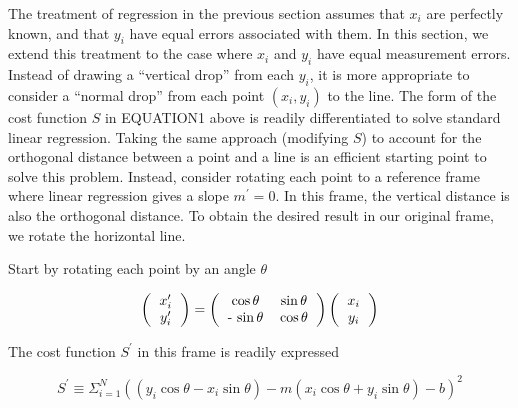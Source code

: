 \documentclass{article}
\begin{document}
The treatment of regression in the previous section assumes that $x_{i}$ are perfectly known, 
and that $y_{i}$ have equal errors associated with them.
In this section, we extend this treatment to the case where $x_{i}$ and $y_{i}$ have equal measurement errors.
Instead of drawing a ``vertical drop'' from each $y_{i}$,
it is more appropriate to consider a ``normal drop'' from each point $ \left( x_{i}, y_{i} \right) $ to the line.
The form of the cost function $S$ in EQUATION1 above is readily differentiated to solve standard linear regression.
Taking the same approach (modifying $S$) to account for the orthogonal distance between a point and a line
 is an efficient starting point to solve this problem.
Instead, consider rotating each point to a reference frame where linear regression gives a slope $ m^{\prime} = 0 $.
In this frame, the vertical distance is also the orthogonal distance.
To obtain the desired result in our original frame, we rotate the horizontal line.

Start by rotating each point by an angle $ \theta $


\begin{equation}
\left(
\begin{tabular}{c}
$x_{i}^{\prime}$ \\
$y_{i}^{\prime}$
\end{tabular}
\right) = 
\left(
\begin{tabular}{cc}
$ \cos \theta$ & $\sin \theta$ \\
 - $\sin \theta$ & $\cos \theta$ \\
\end{tabular}
\right)
\left(
\begin{tabular}{c}
$x_{i}$ \\
$y_{i}$
\end{tabular}
\right)
\end{equation}

The cost function $S^{\prime}$ in this frame is readily expressed

\begin{equation}
S^{\prime} \equiv \Sigma_{i=1}^{N} \left( \left( y_{i} \cos \theta - x_{i} \sin \theta \right) - m \left( x_{i} \cos \theta + y_{i} \sin \theta \right) - b \right)^{2}
\end{equation}
\end{document}
